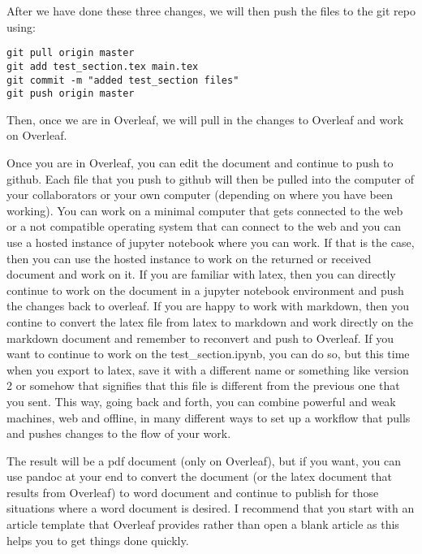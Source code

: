 After we have done these three changes, we will then push the files to
the git repo using:

\begin{verbatim}
git pull origin master
git add test_section.tex main.tex
git commit -m "added test_section files"
git push origin master
\end{verbatim}

Then, once we are in Overleaf, we will pull in the changes to Overleaf
and work on Overleaf.

Once you are in Overleaf, you can edit the document and continue to push to github. Each file that you push to github will then be pulled into the computer of your collaborators or your own computer (depending on where you have been working). You can work on a minimal computer that gets connected to the web or a not compatible operating system that can connect to the web and you can use a hosted instance of jupyter notebook where you can work. If that is the case, then you can use the hosted instance to work on the returned or received document and work on it. If you are familiar with latex, then you can directly continue to work on the document in a jupyter notebook environment and push the changes back to overleaf. If you are happy to work with markdown, then you contine to convert the latex file from latex to markdown and work directly on the markdown document and remember to reconvert and push to Overleaf. If you want to continue to work on the test\_section.ipynb, you can do so, but this time when you export to latex, save it with a different name or something like version 2 or somehow that signifies that this file is different from the previous one that you sent. This way, going back and forth, you can combine powerful and weak machines, web and offline, in many different ways to set up a workflow that pulls and pushes changes to the flow of your work. 

The result will be a pdf document (only on Overleaf), but if you want, you can use pandoc at your end to convert the document (or the latex document that results from Overleaf) to word document and continue to publish for those situations where a word document is desired. I recommend that you start with an article template that Overleaf provides rather than open a blank article as this helps you to get things done quickly. 


